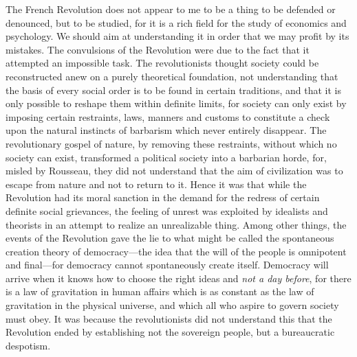 \documentclass{book}
\begin{document}
The French Revolution does not appear to me to be a thing to be defended or denounced, but to be studied, for it is a rich field for the study of economics and psychology. We should aim at understanding it in order that we may profit by its mistakes. The convulsions of the Revolution were due to the fact that it attempted an impossible task. The revolutionists thought society could be reconstructed anew on a purely theoretical foundation, not understanding that the basis of every social order is to be found in certain traditions, and that it is only possible to reshape them within definite limits, for society can only exist by imposing certain restraints, laws, manners and customs to constitute a check upon the natural instincts of barbarism which never entirely disappear. The revolutionary gospel of nature, by removing these restraints, without which no society can exist, transformed a political society into a barbarian horde, for, misled by Rousseau, they did not understand that the aim of civilization was to escape from nature and not to return to it. Hence it was that while the Revolution had its moral sanction in the demand for the redress of certain definite social grievances, the feeling of unrest was exploited by idealists and theorists in an attempt to realize an unrealizable thing. Among other things, the events of the Revolution gave the lie to what might be called the spontaneous creation theory of democracy—the idea that the will of the people is omnipotent and final—for democracy cannot spontaneously create itself. Democracy will arrive when it knows how to choose the right ideas and \emph{not a day before}, for there is a law of gravitation in human affairs which is as constant as the law of gravitation in the physical universe, and which all who aspire to govern society must obey. It was because the revolutionists did not understand this that the Revolution ended by establishing not the sovereign people, but a bureaucratic despotism.
\end{document}
